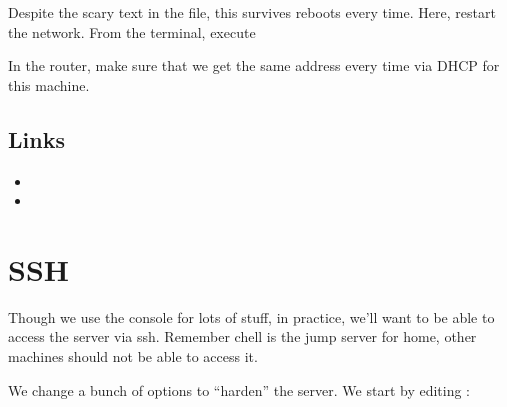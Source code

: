 \documentclass[a4paper,10pt,english]{sphinxmanual}
\begin{document}
Despite the scary text in the file, this survives reboots every time. Here,
restart the network. From the terminal, execute

\begin{sphinxVerbatim}[commandchars=\\\{\}]
  
\end{sphinxVerbatim}

In the router, make sure that we get the same address every time via DHCP for
this machine.


\subsection{Links}
\label{\detokenize{services:id1}}\begin{itemize}
\item {} 

\item {} 

\end{itemize}


\section{SSH}
\label{\detokenize{services:ssh}}
Though we use the console for lots of stuff, in practice, we’ll want to be able
to access the server via ssh. Remember chell is the jump server for home, other
machines should not be able to access it.

We change a bunch of options to “harden” the server. We start by editing
:

\begin{sphinxVerbatim}[commandchars=\\\{\}]
 
 
 
 
 
 
 
 
 
 
 
 
 
\end{sphinxVerbatim}
\end{document}
